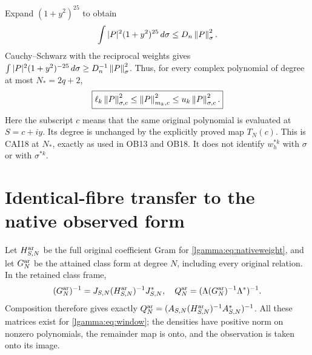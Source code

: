 \documentclass[11pt]{article}
\begin{document}
Expand $(1+y^2)^{25}$ to obtain
\[
 \int|P|^2(1+y^2)^{25}\,d\sigma\le D_n\left\lVert P\right\rVert_\sigma^2.
\]
Cauchy--Schwarz with the reciprocal weights gives
$\int|P|^2(1+y^2)^{-25}\,d\sigma\ge D_n^{-1}\left\lVert P\right\rVert_\sigma^2$.
Thus, for every complex polynomial of degree at most $N_*=2q+2$,
\begin{equation}\label{lgamma:eq:nativecomparison}
 \boxed{\ell_k\left\lVert P\right\rVert_{\sigma,c}^{2}
       \le\left\lVert P\right\rVert_{m_k,c}^{2}
       \le u_k\left\lVert P\right\rVert_{\sigma,c}^{2}.}
\end{equation}
Here the subscript $c$ means that the same original polynomial is
evaluated at $S=c+iy$.  Its degree is unchanged by the explicitly
proved map $T_N(c)$.  This is CAI18 at $N_*$, exactly as used in
OB13 and OB18.  It does not identify $w_h^{*k}$ with $\sigma$ or with
$\sigma^{*k}$.

\section{Identical-fibre transfer to the native observed form}

Let $H_{S,N}^{\rm ar}$ be the full original coefficient Gram for
\eqref{lgamma:eq:nativeweight}, and let $G_N^{\rm ar}$ be the attained class
form at degree $N$, including every original relation.  In the retained
class frame,
\[
 (G_N^{\rm ar})^{-1}
 =J_{S,N}(H_{S,N}^{\rm ar})^{-1}J_{S,N}^*,\quad
 Q_N^{\rm ar}=(\Lambda(G_N^{\rm ar})^{-1}\Lambda^*)^{-1}.
\]
Composition therefore gives exactly
$Q_N^{\rm ar}=(A_{S,N}(H_{S,N}^{\rm ar})^{-1}A_{S,N}^*)^{-1}$.
All these matrices exist for \eqref{lgamma:eq:window}; the densities have
positive norm on nonzero polynomials, the remainder map is onto, and
the observation is taken onto its image.
\end{document}
